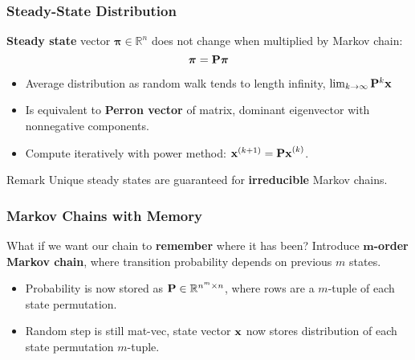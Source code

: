 \documentclass{beamer}
\begin{document}
\begin{frame}
\frametitle{Steady-State Distribution}

\textbf{Steady state} vector $\boldsymbol{\pi} \in \mathbb{R}^n$ does not change when multiplied by Markov chain:
\[ \boldsymbol{\pi} = {\bf P} \boldsymbol{\pi} \]

\begin{itemize}
\item Average distribution as random walk tends to length infinity, $\lim_{k\to\infty} {\bf P}^k{\bf x}$
\item Is equivalent to \textbf{Perron vector} of matrix, dominant eigenvector with nonnegative components.
\item Compute iteratively with power method: ${\bf x}^{(k+1) } = {\bf Px}^{(k)}$.
\end{itemize}

\begin{block}{Remark}
Unique steady states are guaranteed for \textbf{irreducible} Markov chains.
\end{block}
\end{frame}

\begin{frame}
\frametitle{Markov Chains with Memory}
What if we want our chain to \textbf{remember} where it has been?  Introduce \textbf{$\boldsymbol{m}$-order Markov chain}, where transition probability depends on previous $m$ states.  
\begin{itemize}
\item Probability is now stored as ${\bf P} \in \mathbb{R}^{n^m \times n}$, where rows are  a $m$-tuple of each state permutation.
\item Random step is still mat-vec, state vector ${\bf x}$ now stores distribution of each  state permutation $m$-tuple.
\end{itemize}
\end{frame}
\end{document}
